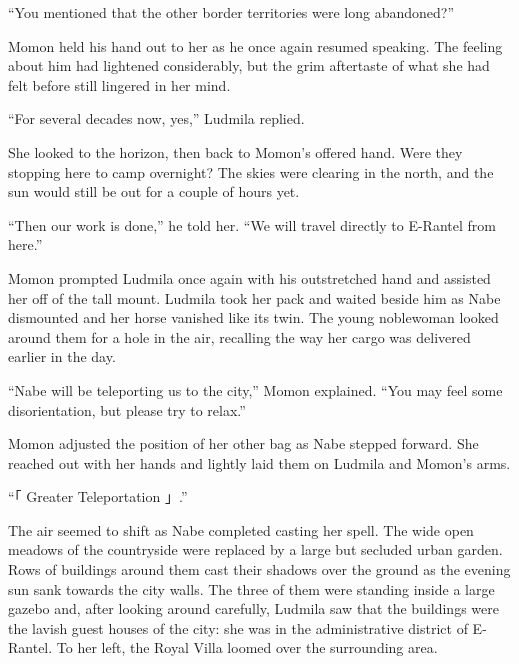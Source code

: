 “You mentioned that the other border territories were long abandoned?”

 

Momon held his hand out to her as he once again resumed speaking. The feeling about him had lightened considerably, but the grim aftertaste of what she had felt before still lingered in her mind.

 

“For several decades now, yes,” Ludmila replied.

 

She looked to the horizon, then back to Momon’s offered hand. Were they stopping here to camp overnight? The skies were clearing in the north, and the sun would still be out for a couple of hours yet.

 

“Then our work is done,” he told her. “We will travel directly to E-Rantel from here.”

 

Momon prompted Ludmila once again with his outstretched hand and assisted her off of the tall mount. Ludmila took her pack and waited beside him as Nabe dismounted and her horse vanished like its twin. The young noblewoman looked around them for a hole in the air, recalling the way her cargo was delivered earlier in the day.

 

“Nabe will be teleporting us to the city,” Momon explained. “You may feel some disorientation, but please try to relax.”

 

Momon adjusted the position of her other bag as Nabe stepped forward. She reached out with her hands and lightly laid them on Ludmila and Momon’s arms.

 

“「 Greater Teleportation 」.”

 

The air seemed to shift as Nabe completed casting her spell. The wide open meadows of the countryside were replaced by a large but secluded urban garden. Rows of buildings around them cast their shadows over the ground as the evening sun sank towards the city walls. The three of them were standing inside a large gazebo and, after looking around carefully, Ludmila saw that the buildings were the lavish guest houses of the city: she was in the administrative district of E-Rantel. To her left, the Royal Villa loomed over the surrounding area.

 

